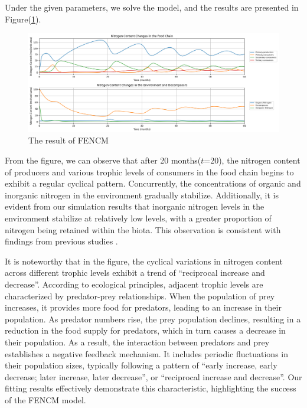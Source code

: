 \documentclass{mcmthesis}
\begin{document}
Under the given parameters, we solve the model, and the results are presented in Figure(\ref{fig:model1_result}).
\begin{figure}[h] 
\centering
\includegraphics[width=\textwidth]{figures/model1_result.png}
\setlength{\abovecaptionskip}{-0.5cm} %
\caption{The result of FENCM}
\label{fig:model1_result}
\end{figure}

From the figure, we can observe that after 20 months($t$=20), the nitrogen content of producers and various trophic levels of consumers in the food chain begins to exhibit a regular cyclical pattern. Concurrently, the concentrations of organic and inorganic nitrogen in the environment gradually stabilize. Additionally, it is evident from our simulation results that inorganic nitrogen levels in the environment stabilize at relatively low levels, with a greater proportion of nitrogen being retained within the biota. This observation is consistent with findings from previous studies \cite{GEISSELER2010}.

It is noteworthy that in the figure, the cyclical variations in nitrogen content across different trophic levels exhibit a trend of “reciprocal increase and decrease”. According to ecological principles, adjacent trophic levels are characterized by predator-prey relationships. When the population of prey increases, it provides more food for predators, leading to an increase in their population. As predator numbers rise, the prey population declines, resulting in a reduction in the food supply for predators, which in turn causes a decrease in their population. As a result, the interaction between predators and prey establishes a negative feedback mechanism. It includes periodic fluctuations in their population sizes, typically following a pattern of “early increase, early decrease; later increase, later decrease”, or “reciprocal increase and decrease”. Our fitting results effectively demonstrate this characteristic, highlighting the success of the FENCM model.
\end{document}
